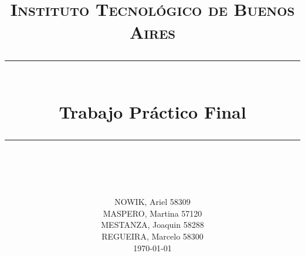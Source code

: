 


\usepackage{listings}
\newcommand{\horrule}[1]{\rule{\linewidth}{#1}}

\title{
        \normalfont \normalsize \textsc{Instituto Tecnológico de Buenos Aires} \\ [25pt]
        \horrule{0.5pt} \\[0.4cm]
        \huge Trabajo Práctico Final \\
        \horrule{2pt} \\[0.5cm]
}
\author{
        \normalfont 								\normalsize
        NOWIK, Ariel 58309\\[-3pt]		\normalsize
        MASPERO, Martina 57120\\[-3pt]		\normalsize
        MESTANZA, Joaquin 58288\\[-3pt]		\normalsize
        REGUEIRA, Marcelo 58300\\[-3pt]		\normalsize
        \today
}
\date{}




\maketitle



